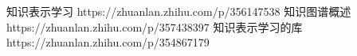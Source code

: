 知识表示学习 https://zhuanlan.zhihu.com/p/356147538
知识图谱概述  https://zhuanlan.zhihu.com/p/357438397
知识表示学习的库 https://zhuanlan.zhihu.com/p/354867179